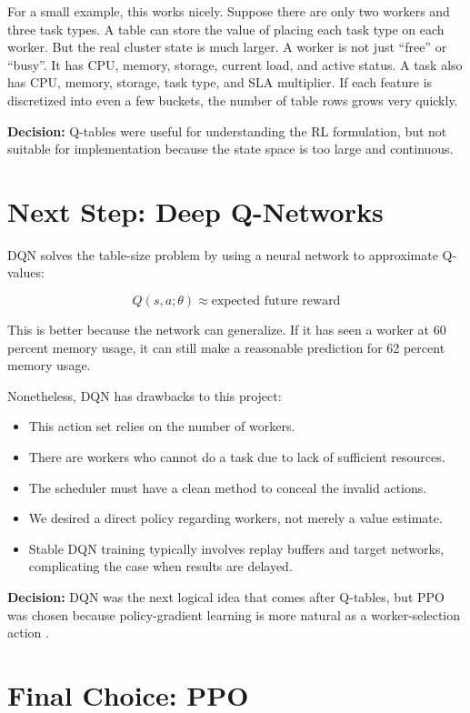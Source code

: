 For a small example, this works nicely. Suppose there are only two workers and three task types. A table can store the value of placing each task type on each worker. But the real cluster state is much larger. A worker is not just ``free'' or ``busy''. It has CPU, memory, storage, current load, and active status. A task also has CPU, memory, storage, task type, and SLA multiplier. If each feature is discretized into even a few buckets, the number of table rows grows very quickly.

\textbf{Decision:} Q-tables were useful for understanding the RL formulation, but not suitable for implementation because the state space is too large and continuous.

\section{Next Step: Deep Q-Networks}

DQN solves the table-size problem by using a neural network to approximate Q-values:

\[
Q(s,a;\theta) \approx \text{expected future reward}
\]

This is better because the network can generalize. If it has seen a worker at 60 percent memory usage, it can still make a reasonable prediction for 62 percent memory usage.


Nonetheless, DQN has drawbacks to this project:

\begin{itemize}
    \item This action set relies on the number of workers.
    \item There are workers who cannot do a task due to lack of sufficient resources.
    \item The scheduler must have a clean method to conceal the invalid actions.
    \item We desired a direct policy regarding workers, not merely a value estimate.
    \item Stable DQN training typically involves replay buffers and target networks, complicating the case when results are delayed.
\end{itemize}

\textbf{Decision:} DQN was the next logical idea that comes after Q-tables, but PPO was chosen because policy-gradient learning is more natural as a worker-selection action \cite{gu2025deeprl}.

\section{Final Choice: PPO} 

